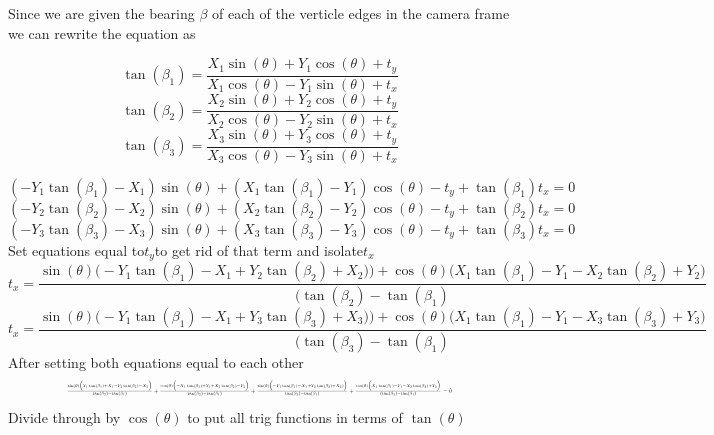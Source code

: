 \documentclass[11pt,english]{article}
\begin{document}
\begin{enumerate}
Since we are given the bearing $\beta$  of each of the verticle edges in the camera frame we can rewrite the equation as 

$$
\tan(\beta_1) =\frac{X_1 \sin(\theta) + Y_1 \cos(\theta) +t_y}{X_1 \cos(\theta) - Y_1 \sin(\theta) + t_x}
$$
$$
\tan(\beta_2) =\frac{X_2 \sin(\theta) + Y_2 \cos(\theta) +t_y}{X_2 \cos(\theta) - Y_2 \sin(\theta) + t_x}
$$
$$
\tan(\beta_3) =\frac{X_3 \sin(\theta) + Y_3 \cos(\theta) +t_y}{X_3 \cos(\theta) - Y_3 \sin(\theta) + t_x}
$$

$$
(-Y_1 \tan(\beta_1) - X_1)\sin(\theta) + (X_1 \tan(\beta_1) - Y_1 )\cos(\theta) - t_y + \tan(\beta_1)t_x = 0 
$$
$$
(-Y_2 \tan(\beta_2) - X_2)\sin(\theta) + (X_2 \tan(\beta_2) - Y_2 )\cos(\theta) - t_y + \tan(\beta_2)t_x = 0 
$$
$$
(-Y_3 \tan(\beta_3) - X_3)\sin(\theta) + (X_3 \tan(\beta_3) - Y_3 )\cos(\theta) - t_y + \tan(\beta_3)t_x = 0 
$$
Set equations equal to$ t_y $to get rid of that term and isolate$ t_x $ 
\begin{equation}
 t_x  =\frac{\sin(\theta) \Big(-Y_1 \tan(\beta_1) -X_1 + Y_2 \tan(\beta_2) + X_2 )\Big) + \cos(\theta) \Big( X_1 \tan(\beta_1)  -Y_1 - X_2\tan(\beta_2) + Y_2\Big) } {(\tan(\beta_2) - \tan(\beta_1)} 
\end{equation}
$$
 t_x  =\frac{\sin(\theta) \Big(-Y_1 \tan(\beta_1) -X_1 + Y_3 \tan(\beta_3) + X_3 )\Big) + \cos(\theta) \Big( X_1 \tan(\beta_1)  -Y_1 - X_3\tan(\beta_3) + Y_3\Big) } {(\tan(\beta_3) - \tan(\beta_1)} 
$$
After setting both equations equal to each other 
\begin{equation}
\resizebox{.8\hsize}{!}{$\frac{\sin(\theta) \Big(Y_1 \tan(\beta_1) +X_1 - Y_3 \tan(\beta_3) - X_3 \Big)}{\tan(\beta_3) - \tan(\beta_1)} + \frac{\cos(\theta) \Big(- X_1 \tan(\beta_1)  +Y_1 +X_3\tan(\beta_3) - Y_3\Big)}{\tan(\beta_3) - \tan(\beta_1)} +\frac{\sin(\theta) \Big(-Y_1 \tan(\beta_1) -X_1 + Y_2 \tan(\beta_2) + X_2 )\Big) }{\tan(\beta_2) -\tan(\beta_1)} +
\frac{\cos(\theta) \Big( X_1 \tan(\beta_1)  -Y_1 - X_2\tan(\beta_2) + Y_2\Big) } {(\tan(\beta_2) - \tan(\beta_1)}  = 0
$}
\end{equation}
Divide through by $\cos(\theta)$ to put all trig functions in terms of $\tan(\theta)$


\end{enumerate}
\end{document}

